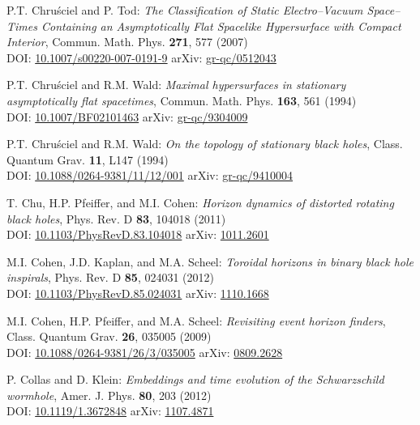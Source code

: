 \begin{thebibliography}{123}
P.T. Chru\'sciel and P. Tod:
{\em The Classification of Static Electro–Vacuum Space–Times Containing an Asymptotically Flat Spacelike Hypersurface with Compact Interior},
Commun. Math. Phys. {\bf 271}, 577 (2007)\\
DOI: \href{https://doi.org/10.1007/s00220-007-0191-9}{10.1007/s00220-007-0191-9}\hfill
arXiv: \href{https://arxiv.org/abs/gr-qc/0512043}{gr-qc/0512043}

P.T. Chru\'sciel and R.M. Wald:
{\em Maximal hypersurfaces in stationary asymptotically flat spacetimes},
Commun. Math. Phys. {\bf 163}, 561 (1994)\\
DOI: \href{https://doi.org/10.1007/BF02101463}{10.1007/BF02101463}\hfill
arXiv: \href{https://arxiv.org/abs/gr-qc/9304009}{gr-qc/9304009}

P.T. Chru\'sciel and R.M. Wald:
{\em On the topology of stationary black holes},
Class. Quantum Grav. {\bf 11}, L147 (1994)\\
DOI: \href{https://doi.org/10.1088/0264-9381/11/12/001}{10.1088/0264-9381/11/12/001}\hfill
arXiv: \href{https://arxiv.org/abs/gr-qc/9410004}{gr-qc/9410004}

T. Chu, H.P. Pfeiffer, and M.I. Cohen:
{\em Horizon dynamics of distorted rotating black holes},
Phys. Rev. D {\bf 83}, 104018 (2011)\\
DOI: \href{https://doi.org/10.1103/PhysRevD.83.104018}{10.1103/PhysRevD.83.104018}\hfill
arXiv: \href{https://arxiv.org/abs/1011.2601}{1011.2601}

M.I. Cohen, J.D. Kaplan, and M.A. Scheel:
{\em Toroidal horizons in binary black hole inspirals},
Phys. Rev. D {\bf 85}, 024031 (2012)\\
DOI: \href{https://doi.org/10.1103/PhysRevD.85.024031}{10.1103/PhysRevD.85.024031}\hfill
arXiv: \href{https://arxiv.org/abs/1110.1668}{1110.1668}

M.I. Cohen, H.P. Pfeiffer, and M.A. Scheel:
{\em Revisiting event horizon finders},
Class. Quantum Grav. {\bf 26}, 035005 (2009)\\
DOI: \href{https://doi.org/10.1088/0264-9381/26/3/035005}{10.1088/0264-9381/26/3/035005}\hfill
arXiv: \href{https://arxiv.org/abs/0809.2628}{0809.2628}

P. Collas and D. Klein:
{\em Embeddings and time evolution of the Schwarzschild wormhole},
Amer. J. Phys. {\bf 80}, 203 (2012)\\
DOI: \href{https://doi.org/10.1119/1.3672848}{10.1119/1.3672848}\hfill
arXiv: \href{https://arxiv.org/abs/1107.4871}{1107.4871}


\end{thebibliography}
